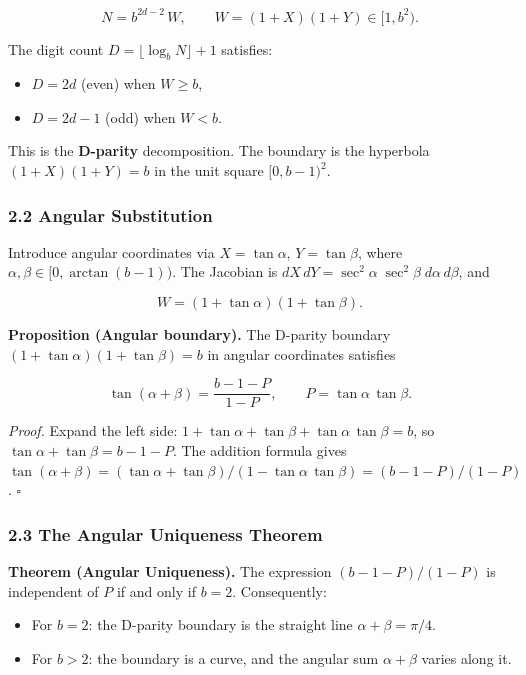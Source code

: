 \documentclass[
  11pt,
]{article}
\providecommand{\tightlist}{%
  \setlength{\itemsep}{0pt}\setlength{\parskip}{0pt}}
\begin{document}
\[N = b^{2d-2}\,W, \qquad W = (1+X)(1+Y) \in [1, b^2).\]

The digit count \(D = \lfloor\log_b N\rfloor + 1\) satisfies:

\begin{itemize}
\tightlist
\item
  \(D = 2d\) (even) when \(W \geq b\),
\item
  \(D = 2d - 1\) (odd) when \(W < b\).
\end{itemize}

This is the \textbf{D-parity} decomposition. The boundary is the hyperbola
\((1+X)(1+Y) = b\) in the unit square \([0, b-1)^2\).

\subsubsection{2.2 Angular Substitution}\label{angular-substitution}

Introduce angular coordinates via \(X = \tan\alpha\), \(Y = \tan\beta\), where
\(\alpha, \beta \in [0, \arctan(b-1))\). The Jacobian is
\(dX\,dY = \sec^2\!\alpha\;\sec^2\!\beta\;d\alpha\,d\beta\), and

\[W = (1 + \tan\alpha)(1 + \tan\beta).\]

\textbf{Proposition (Angular boundary).} The D-parity boundary
\((1+\tan\alpha)(1+\tan\beta) = b\) in angular coordinates satisfies

\[\tan(\alpha + \beta) = \frac{b - 1 - P}{1 - P}, \qquad P = \tan\alpha\,\tan\beta.\]

\emph{Proof.} Expand the left side:
\(1 + \tan\alpha + \tan\beta + \tan\alpha\,\tan\beta = b\), so
\(\tan\alpha + \tan\beta = b - 1 - P\). The addition formula gives
\(\tan(\alpha+\beta) = (\tan\alpha + \tan\beta)/(1 - \tan\alpha\,\tan\beta) = (b-1-P)/(1-P)\).
\(\square\)

\subsubsection{2.3 The Angular Uniqueness
Theorem}\label{the-angular-uniqueness-theorem}

\textbf{Theorem (Angular Uniqueness).} The expression \((b-1-P)/(1-P)\) is
independent of \(P\) if and only if \(b = 2\). Consequently:

\begin{itemize}
\tightlist
\item
  For \(b = 2\): the D-parity boundary is the straight line
  \(\alpha + \beta = \pi/4\).
\item
  For \(b > 2\): the boundary is a curve, and the angular sum \(\alpha + \beta\)
  varies along it.
\end{itemize}
\end{document}
